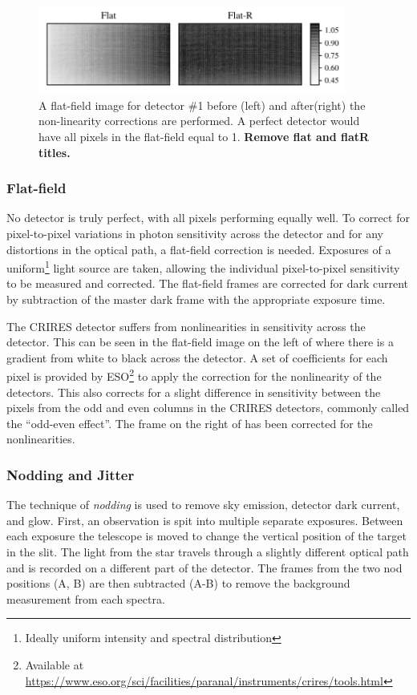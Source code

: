 \begin{figure}[h]
    \centering
    \includegraphics[width=0.9\textwidth]{figures/reduction/master_flats_1.pdf}
    \caption{A flat-field image for detector \#1 before (left) and after(right) the non-linearity corrections are performed. A perfect detector would have all pixels in the flat-field equal to 1. \bf{\red Remove flat and flatR titles.}}
    \label{fig:masterflats}
\end{figure}

\subsubsection{Flat-field}
No detector is truly perfect, with all pixels performing equally well. To correct for pixel-to-pixel variations in photon sensitivity across the detector and for any distortions in the optical path, a flat-field correction is needed. Exposures of a uniform\footnote{Ideally uniform intensity and spectral distribution} light source are taken, allowing the individual pixel-to-pixel sensitivity to be measured and corrected. The flat-field frames are corrected for dark current by subtraction of the master dark frame with the appropriate exposure time.

The CRIRES detector suffers from nonlinearities in sensitivity across the detector. This can be seen in the flat-field image on the left of  where there is a gradient from white to black across the detector. A set of coefficients for each pixel is provided by ESO\footnote{Available at \href{https://www.eso.org/sci/facilities/paranal/instruments/crires/tools.html}{https://www.eso.org/sci/facilities/paranal/instruments/crires/tools.html}} to apply the correction for the nonlinearity of the detectors. This also corrects for a slight difference in sensitivity between the pixels from the odd and even columns in the CRIRES detectors, commonly called the ``odd-even effect''. The frame on the right of  has been corrected for the nonlinearities.

\subsubsection{Nodding and Jitter}
The technique of \emph{nodding} is used to remove sky emission, detector dark current, and glow. First, an observation is spit into multiple separate exposures. Between each exposure the telescope is moved to change the vertical position of the target in the slit. The light from the star travels through a slightly different optical path and is recorded on a different part of the detector. The frames from the two nod positions (A, B) are then subtracted (A-B) to remove the background measurement from each spectra.

